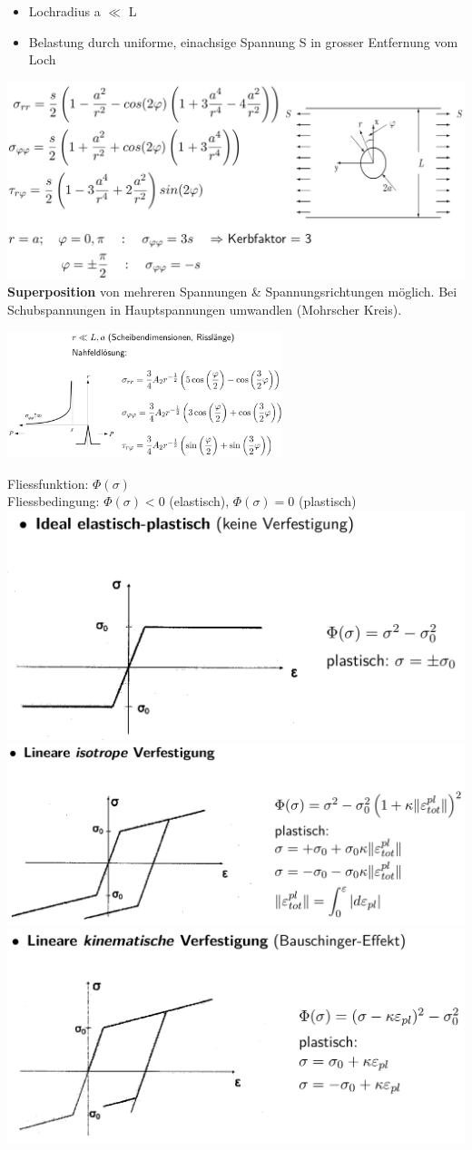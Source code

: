 \documentclass[a4paper,10pt]{article}
\begin{document}
\begin{multicols*}{3}
            \begin{itemize}
                \item Lochradius a $\ll$ L
                \item Belastung durch uniforme, einachsige Spannung S in grosser Entfernung vom Loch
            \end{itemize}
            \includegraphics[width=\linewidth]{Scheibeloch}
            \textbf{Superposition} von mehreren Spannungen \& Spannungsrichtungen möglich. Bei Schubspannungen in Hauptspannungen umwandlen (Mohrscher Kreis).
            
        \includegraphics[width=80mm]{Scheiberiss}
        
            Fliessfunktion: $\Phi(\sigma)$\\
            Fliessbedingung: $\Phi(\sigma)<0$ (elastisch), $\Phi(\sigma)=0$ (plastisch)
            \includegraphics[width=0.45\linewidth]{Verf_ideal_elpl}
            \includegraphics[width=0.5\linewidth]{Verf_lin_isotr}
            \includegraphics[width=0.5\linewidth]{Verf_lin_kin}
            

\end{multicols*}
\end{document}
